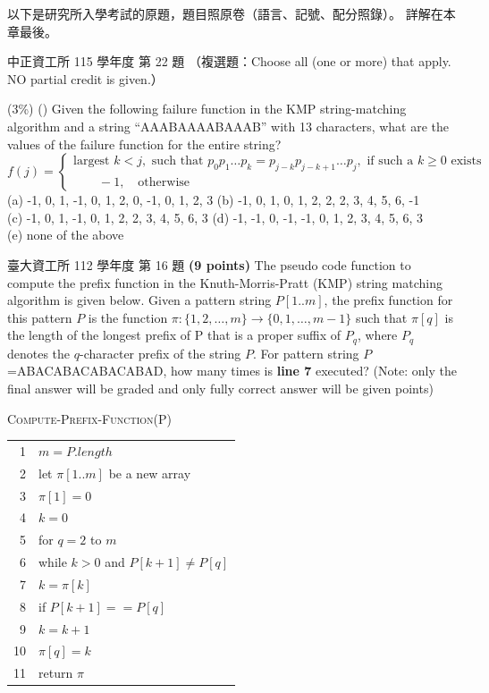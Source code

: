 以下是研究所入學考試的原題，題目照原卷（語言、記號、配分照錄）。 詳解在本章最後。

\begin{pastexam}[label={px:stm-1}]{中正資工所 115 學年度 第 22 題}
（複選題：Choose all (one or more) that apply. NO partial credit is given.）

(3\%) (\qquad) Given the following failure function in the KMP string-matching algorithm and a string
``AAABAAAABAAAB'' with 13 characters, what are the values of the failure function for the entire string?
\[
f(j)=\begin{cases}\text{largest } k<j,\text{ such that } p_0p_1\ldots p_k=p_{j-k}p_{j-k+1}\ldots p_j,
\text{ if such a } k\ge 0 \text{ exists}\\
\qquad -1,\quad \text{otherwise}\end{cases}
\]
(a) -1, 0, 1, -1, 0, 1, 2, 0, -1, 0, 1, 2, 3 \quad (b) -1, 0, 1, 0, 1, 2, 2, 2, 3, 4, 5, 6, -1\\
(c) -1, 0, 1, -1, 0, 1, 2, 2, 3, 4, 5, 6, 3 \quad (d) -1, -1, 0, -1, -1, 0, 1, 2, 3, 4, 5, 6, 3\\
(e) none of the above
\end{pastexam}

\begin{pastexam}[label={px:stm-2}]{臺大資工所 112 學年度 第 16 題}
\textbf{(9 points)} The pseudo code function to compute the prefix function in the Knuth-Morris-Pratt (KMP)
string matching algorithm is given below. Given a pattern string $P[1..m]$, the prefix function for this
pattern $P$ is the function $\pi:\{1,2,\ldots,m\}\to\{0,1,\ldots,m-1\}$ such that $\pi[q]$ is the length of
the longest prefix of P that is a proper suffix of $P_q$, where $P_q$ denotes the $q$-character prefix of
the string $P$. For pattern string $P$=ABACABACABACABAD, how many times is \textbf{line 7} executed?
(Note: only the final answer will be graded and only fully correct answer will be given points)

\smallskip
\textsc{Compute-Prefix-Function}(P)\par
\begin{tabular}{@{}r@{\quad}l@{}}
1 & $m = P.length$ \\
2 & let $\pi[1..m]$ be a new array \\
3 & $\pi[1] = 0$ \\
4 & $k = 0$ \\
5 & for $q = 2$ to $m$ \\
6 & \quad while $k > 0$ and $P[k+1] \ne P[q]$ \\
7 & \quad\quad $k = \pi[k]$ \\
8 & \quad if $P[k+1] == P[q]$ \\
9 & \quad\quad $k = k+1$ \\
10 & \quad $\pi[q] = k$ \\
11 & return $\pi$
\end{tabular}
\end{pastexam}

